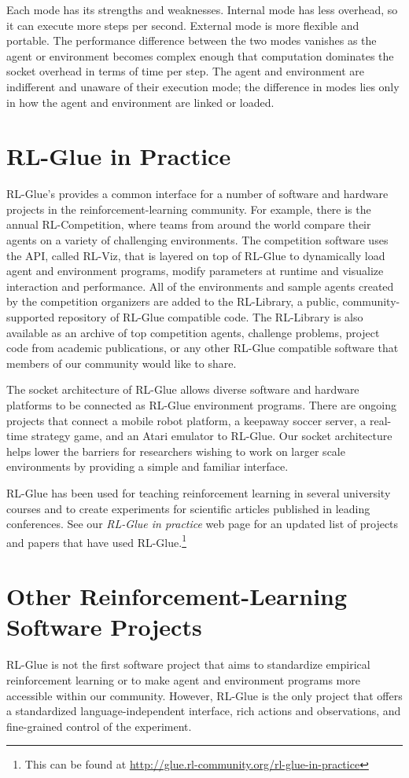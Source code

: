 \documentclass[twoside,11pt]{article}
\begin{document}
Each mode has its strengths and weaknesses. Internal mode has less overhead, so it can execute more steps per second. External mode is more flexible and portable.  The performance difference between the two modes vanishes as the agent or environment becomes complex enough that computation dominates the socket overhead in terms of time per step.  The agent and environment are indifferent and unaware of their execution mode; the difference in modes lies only in how the agent and environment are linked or loaded.

\section{RL-Glue in Practice}
RL-Glue's provides a common interface for a number of software and hardware projects in the reinforcement-learning community. For example, there is the annual RL-Competition, where teams from around the world compare their agents on a variety of challenging environments.  The competition software uses the API, called RL-Viz, that is layered on top of RL-Glue to dynamically load agent and environment programs, modify parameters at runtime and visualize interaction and performance.  All of the environments and sample agents created by the competition organizers are added to the RL-Library, a public, community-supported repository of RL-Glue compatible code. The RL-Library is also available as an archive of top competition agents, challenge problems, project code from academic publications, or any other RL-Glue compatible software that members of our community would like to share.


The socket architecture of RL-Glue allows diverse software and hardware platforms to be connected as RL-Glue environment programs.  There are ongoing projects that connect a mobile robot platform, a keepaway soccer server, a real-time strategy game, and an Atari emulator to RL-Glue. Our socket architecture helps lower the barriers for researchers wishing to work on larger scale environments by providing a simple and familiar interface. 


RL-Glue has been used for teaching reinforcement learning in several university courses and to create experiments for scientific articles published in leading conferences.  See our \textit{RL-Glue in practice} web page for an updated list of projects and papers that have used RL-Glue.\footnote{This can be found at \url{http://glue.rl-community.org/rl-glue-in-practice}} 


\section{Other Reinforcement-Learning Software Projects}
RL-Glue is not the first software project that aims to  standardize empirical reinforcement learning or to make agent and environment programs more accessible within our community.  However, RL-Glue is the only project that offers a standardized language-independent interface, rich actions and observations, and fine-grained control of the experiment.
\end{document}
